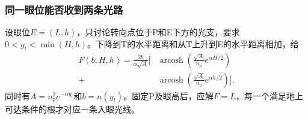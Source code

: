 \documentclass[UTF8,fontset=fandol,a4paper,11pt]{ctexart}
\begin{document}
\subsubsection*{同一眼位能否收到两条光路}
设眼位$E=(L,h)$，只讨论转向点位于P和E下方的光支，要求$0<y_t<\min(H,h)$。下降到T的水平距离和从T上升到E的水平距离相加，给
\[
\begin{aligned}
F(b;H,h)
=\frac{2b}{\alpha\sqrt A}\biggl[
&\operatorname{arcosh}\left(\frac{\sqrt A}{n_p}e^{\alpha H/2}\right)\\
+&\operatorname{arcosh}\left(\frac{\sqrt A}{n_p}e^{\alpha h/2}\right)
\biggr].
\end{aligned}
\]
同时有$A=n_p^2e^{-\alpha y_t}$和$b=n(y_t)$。固定P及眼高后，应解$F=L$，每一个满足地上可达条件的根才对应一条入眼光线。
\begin{center}\begin{minipage}{.97\linewidth}\centering
{}
\end{minipage}
\end{center}
\end{document}
